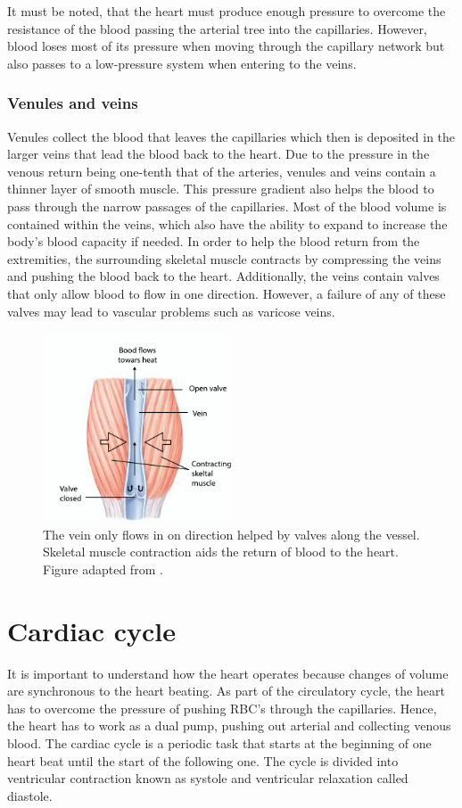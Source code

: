 It must be noted, that the heart must produce enough pressure to overcome the resistance of the blood passing the arterial tree into the capillaries. However, blood loses most of its pressure when moving through the capillary network but also passes to a low-pressure system when entering to the veins. 

\subsubsection{Venules and veins}
Venules collect the blood that leaves the capillaries which then is deposited in the larger veins that lead the blood back to the heart. Due to the pressure in the venous return being one-tenth that of the arteries, venules and veins contain a thinner layer of smooth muscle. This pressure gradient also helps the blood to pass through the narrow passages of the capillaries. Most of the blood volume is contained within the veins, which also have the ability to expand to increase the body's blood capacity if needed. In order to help the blood return from the extremities, the surrounding skeletal muscle contracts by compressing the veins and pushing the blood back to the heart. Additionally, the veins contain valves that only allow blood to flow in one direction. However, a failure of any of these valves may lead to vascular problems such as varicose veins. 

\begin{figure}[!htpb]
	\centering
	\includegraphics[width=0.5\textwidth,keepaspectratio]{figure2}    
	\caption[Venous return through skeletal muscle]{The vein only flows in on direction helped by valves along the vessel. Skeletal muscle contraction aids the return of blood to the heart. Figure adapted from \cite{johnson2001biology}. }
	\label{fig:venous return}
\end{figure}

\section{Cardiac cycle}
It is important to understand how the heart operates because changes of volume are synchronous to the heart beating. As part of the circulatory cycle, the heart has to overcome the pressure of pushing RBC's through the capillaries. Hence, the heart has to work as a dual pump, pushing out arterial and collecting venous blood. The cardiac cycle is a periodic task that starts at the beginning of one heart beat until the start of the following one. The cycle is divided into ventricular contraction known as systole and ventricular relaxation called diastole. 

